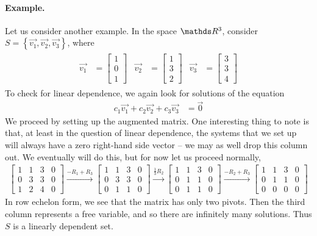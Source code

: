 \documentclass[11pt]{article}
\newcommand{\vek}[1]{\vec{#1}}
\begin{document}
\paragraph{Example.}
Let us consider another example. In the space $\bbR^3$, consider $S = \left\{ \vek{v_1}, \vek{v_2}, \vek{v_3} \right\}$, where
\begin{align*}
\begin{aligned}
\vek{v_1} &= \begin{bmatrix}1\\0\\1\end{bmatrix}
&
\vek{v_2} &= \begin{bmatrix}1\\3\\2\end{bmatrix}
&
\vek{v_3} &= \begin{bmatrix}3\\3\\4\end{bmatrix}
\end{aligned}
\end{align*}
To check for linear dependence, we again look for solutions of the equation
\begin{align*}
c_1 \vek{v_1} + c_2 \vek{v_2} + c_3 \vek{v_3} &= \vek{0}
\end{align*}
We proceed by setting up the augmented matrix. One interesting thing to note is that, at least in the question of linear dependence, the systems that we set up will always have a zero right-hand side vector -- we may as well drop this column out. We eventually will do this, but for now let us proceed normally,
\begin{align*}
\left[\begin{matrix}
1 & 1 & 3 & 0
\\
0 & 3 & 3 & 0
\\
1 & 2 & 4 & 0
\end{matrix}\right]
\xrightarrow[]{-R_1 + R_3}
\left[\begin{matrix}
1 & 1 & 3 & 0
\\
0 & 3 & 3 & 0
\\
0 & 1 & 1 & 0
\end{matrix}\right]
\xrightarrow[]{\frac{1}{3}R_2}
\left[\begin{matrix}
1 & 1 & 3 & 0
\\
0 & 1 & 1 & 0
\\
0 & 1 & 1 & 0
\end{matrix}\right]
\xrightarrow[]{-R_2 + R_3}
\left[\begin{matrix}
1 & 1 & 3 & 0
\\
0 & 1 & 1 & 0
\\
0 & 0 & 0 & 0
\end{matrix}\right]
\end{align*}
In row echelon form, we see that the matrix has only two pivots. Then the third column represents a free variable, and so there are infinitely many solutions. Thus $S$ is a linearly dependent set.
\end{document}
